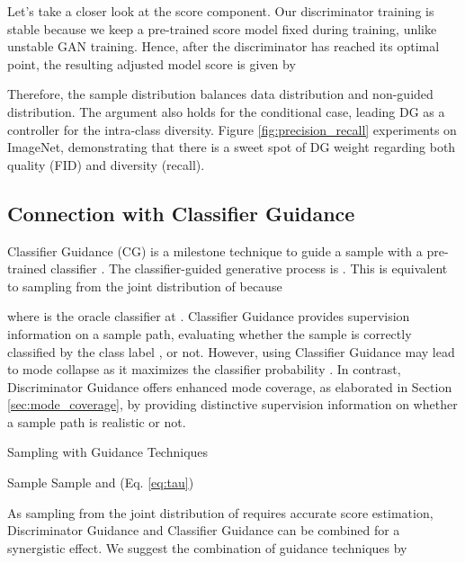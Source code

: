\documentclass{article}
\theoremstyle{plain}
\theoremstyle{definition}
\theoremstyle{remark}
\begin{document}
Let's take a closer look at the score component. Our discriminator training is stable because we keep a pre-trained score model fixed during training, unlike unstable GAN training. Hence, after the discriminator has reached its optimal point, the resulting adjusted model score is given by

Therefore, the sample distribution  balances data distribution and non-guided distribution. The argument also holds for the conditional case, leading DG as a controller for the intra-class diversity. Figure \ref{fig:precision_recall} experiments on ImageNet, demonstrating that there is a sweet spot of DG weight regarding both quality (FID) and diversity (recall).

\subsection{Connection with Classifier Guidance}

Classifier Guidance (CG) \cite{dhariwal2021diffusion} is a milestone technique to guide a sample with a pre-trained classifier . The classifier-guided generative process is . This is equivalent to sampling from the joint distribution of  because

where  is the oracle classifier at . Classifier Guidance provides supervision information on a sample path, evaluating whether the sample is correctly classified by the class label , or not. However, using Classifier Guidance may lead to mode collapse as it maximizes the classifier probability . In contrast, Discriminator Guidance offers enhanced mode coverage, as elaborated in Section \ref{sec:mode_coverage}, by providing distinctive supervision information on whether a sample path is realistic or not.

\begin{algorithm}[t]
	\centering
	\caption{Sampling with Guidance Techniques}\label{alg:sampler}
	\begin{algorithmic}[1]
		\STATE Sample 
		\STATE Sample  and 
		\STATE  \cite{karras2022elucidating}
		\STATE 
		\STATE 
		\STATE  (Eq. \eqref{eq:tau})
		\STATE 
		\STATE 
		\STATE 
		\ENDFOR
	\end{algorithmic}
\end{algorithm}

As sampling from the joint distribution of  requires accurate score estimation, Discriminator Guidance and Classifier Guidance can be combined for a synergistic effect. We suggest the combination of guidance techniques by
\end{document}
